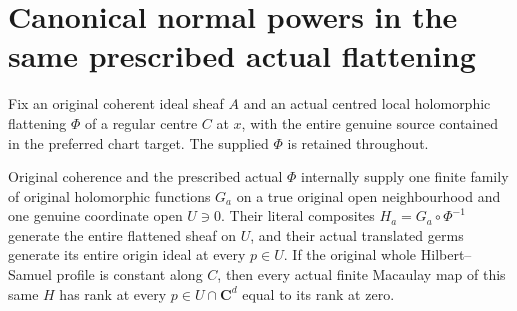 \section{Canonical normal powers in the same prescribed actual flattening}
\label{sec:hironaka-actual-supplied-flattening-normal-powers}
Fix an original coherent ideal sheaf $A$ and an actual centred local holomorphic flattening $\Phi$ of a regular centre $C$ at $x$, with the entire genuine source contained in the preferred chart target. The supplied $\Phi$ is retained throughout.

\begin{theorem}
\label{hir:actual-supplied-flattening-original-family-ranks}
\leanok
Original coherence and the prescribed actual $\Phi$ internally supply one finite family of original holomorphic functions $G_a$ on a true original open neighbourhood and one genuine coordinate open $U\ni0$. Their literal composites $H_a=G_a\circ\Phi^{-1}$ generate the entire flattened sheaf on $U$, and their actual translated germs generate its entire origin ideal at every $p\in U$. If the original whole Hilbert--Samuel profile is constant along $C$, then every actual finite Macaulay map of this same $H$ has rank at every $p\in U\cap\mathbf C^d$ equal to its rank at zero.
\end{theorem}
